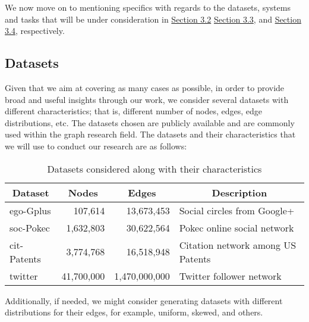 \documentclass[a4paper,11pt]{article}
\begin{document}
\medskip

\par We now move on to mentioning specifics with regards to the datasets, systems and tasks that will be under consideration in \hyperref[datasets]{Section 3.2} \hyperref[graph-proc]{Section 3.3}, and \hyperref[algos]{Section 3.4}, respectively.

\subsection{Datasets} \label{datasets}

\par Given that we aim at covering as many cases as possible, in order to provide broad and useful insights through our work, we consider several datasets with different characteristics; that is, different number of nodes, edges, edge distributions, etc. The datasets chosen are publicly available and are commonly used within the graph research field. The datasets and their characteristics that we will use to conduct our research are as follows:

\bigskip

\begin{table}[H]
	\centering
	\begin{tabular}{|l|r|r|l|}
	\hline
	\multicolumn{1}{|c|}{\textbf{Dataset}} & \multicolumn{1}{c|}{\textbf{Nodes}} & \multicolumn{1}{c|}{\textbf{Edges}} & \multicolumn{1}{c|}{\textbf{Description}} \\ \hline
	\hline
	ego-Gplus \cite{snapnets} & 107,614 & 13,673,453 & Social circles from Google+ \\ \hline
	soc-Pokec \cite{snapnets} & 1,632,803 & 30,622,564 & Pokec online social network \\ \hline
	cit-Patents \cite{snapnets} & 3,774,768 & 16,518,948 & Citation network among US Patents \\ \hline
	twitter \cite{twitter} & 41,700,000 & 1,470,000,000 & Twitter follower network \\ \hline
	\end{tabular}
	\caption{Datasets considered along with their characteristics}
	\label{dataset-table}
\end{table}

\medskip

\par Additionally, if needed, we might consider generating datasets with different distributions for their edges, for example, uniform, skewed, and others.
\end{document}
